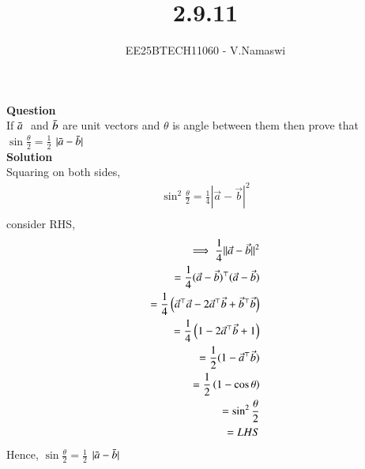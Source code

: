 \documentclass[journal]{IEEEtran}
\begin{document}

\vspace{3cm}

\title{2.9.11}
\author{EE25BTECH11060 - V.Namaswi}
{\let\newpage\relax\maketitle}
\renewcommand{\thefigure}{\theenumi}
\renewcommand{\thetable}{\theenumi}
\setlength{\intextsep}{10pt} %
\textbf{Question}\\If $\Bar{a} \;$ and \;$ \Bar{b} $ are unit vectors and $\theta$ is angle between them then prove that $\sin\frac{\theta}{2}=\frac{1}{2}$ $| {\Bar{a}-\Bar{b}}|$\\
\textbf{Solution}\\Squaring on both sides,
\begin{align*}
    \sin^2\frac{\theta}{2}=\frac{1}{4}| {\Vec{a}}-\Vec{b}|^2\\
    \end{align*}
  consider RHS,\\
\begin{align}
 \implies \frac{1}{4} \|\Vec{a}-\Vec{b}\|^2 \\
 = \frac{1}{4}(\Vec{a}-\Vec{b})^\top  (\Vec{a}-\Vec{b})\\
 = \frac{1}{4} \left(\Vec{a} ^\top \Vec{a} - 2 \Vec{a} ^\top \Vec{b} + \Vec{b} ^\top \Vec{b}\right)\\
  =\frac{1}{4} \left(  1 - 2 \Vec{a} ^\top \Vec{b} + 1 \right)\\
  = \frac{1}{2} (1 - \Vec{a} ^\top \Vec{b})\\
  =\frac{1}{2}\left(1-\cos \theta\right)\\
  =\sin^2{\frac{\theta}{2}}\\
=LHS
\end{align}
Hence, $\sin\frac{\theta}{2}=\frac{1}{2}$  $| {\Bar{a}-\Bar{b}}|
$ 
\end{document}
